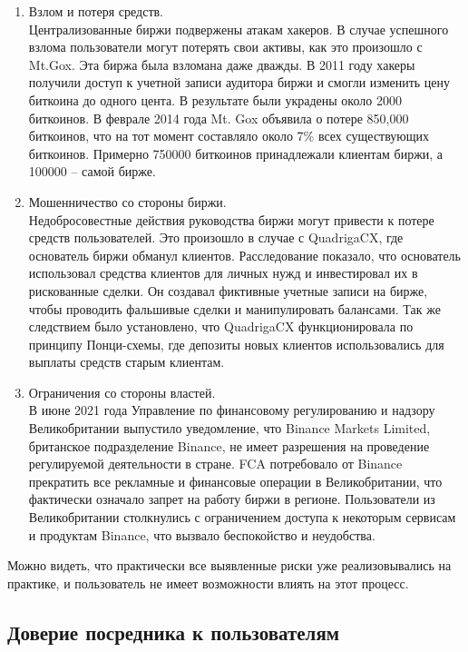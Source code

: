 \begin{enumerate}
\item Взлом и потеря средств.\\
Централизованные биржи подвержены атакам хакеров. В случае успешного взлома пользователи могут потерять свои активы, как это произошло с Mt.Gox\cite{label23}. Эта биржа была взломана даже дважды. В 2011 году хакеры получили доступ к учетной записи аудитора биржи и смогли изменить цену биткоина до одного цента. В результате были украдены около 2000 биткоинов. В феврале 2014 года Mt. Gox объявила о потере 850,000 биткоинов, что на тот момент составляло около 7\% всех существующих биткоинов. Примерно 750000 биткоинов принадлежали клиентам биржи, а 100000 -- самой бирже. 
\item Мошенничество со стороны биржи.\\
Недобросовестные действия руководства биржи могут привести к потере средств пользователей. Это произошло в случае с QuadrigaCX, где основатель биржи обманул клиентов\cite{label24}. Расследование показало, что основатель использовал средства клиентов для личных нужд и инвестировал их в рискованные сделки. Он создавал фиктивные учетные записи на бирже, чтобы проводить фальшивые сделки и манипулировать балансами. Так же следствием было установлено, что QuadrigaCX функционировала по принципу Понци-схемы, где депозиты новых клиентов использовались для выплаты средств старым клиентам.
\item Ограничения со стороны властей.\\
В июне 2021 года Управление по финансовому регулированию и надзору Великобритании выпустило уведомление, что Binance Markets Limited, британское подразделение Binance, не имеет разрешения на проведение регулируемой деятельности в стране\cite{label25}. FCA потребовало от Binance прекратить все рекламные и финансовые операции в Великобритании, что фактически означало запрет на работу биржи в регионе. Пользователи из Великобритании столкнулись с ограничением доступа к некоторым сервисам и продуктам Binance, что вызвало беспокойство и неудобства.
\end{enumerate}

Можно видеть, что практически все выявленные риски уже реализовывались на практике, и пользователь не имеет возможности влиять на этот процесс.

\subsection{Доверие посредника к пользователям}


